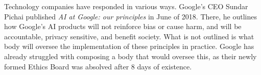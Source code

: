 Technology companies have responded in various ways. Google's CEO Sundar Pichai
published \textit{AI at Google: our principles} in June of 2018. There, he
outlines how Google's AI products will not reinforce bias or cause harm, and
will be accountable, privacy sensitive, and benefit society. What is not
outlined is what body will oversee the implementation of these principles in
practice. Google has already struggled with composing a body that would oversee
this, as their newly formed Ethics Board was absolved after 8 days of existence.


